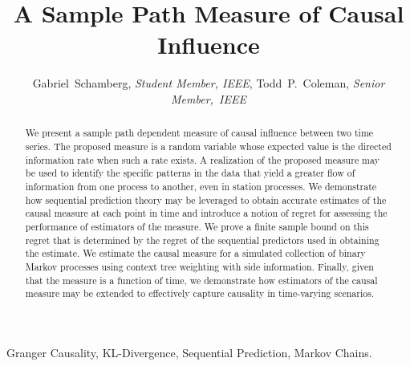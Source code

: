 \documentclass[conference]{IEEEtran}
\begin{document}
\title{A Sample Path Measure of Causal Influence}
%

\author{
Gabriel~Schamberg, \emph{Student Member, IEEE},
Todd~P.~Coleman, \emph{Senior Member,~IEEE}
}

\maketitle


\begin{abstract}
We present a sample path dependent measure of causal influence between two time series. The proposed measure is a random variable whose expected value is the directed information rate when such a rate exists. A realization of the proposed measure may be used to identify the specific patterns in the data that yield a greater flow of information from one process to another, even in station processes. We demonstrate how sequential prediction theory may be leveraged to obtain accurate estimates of the causal measure at each point in time and introduce a notion of regret for assessing the performance of estimators of the measure. We prove a finite sample bound on this regret that is determined by the regret of the sequential predictors used in obtaining the estimate. We estimate the causal measure for a simulated collection of binary Markov processes using context tree weighting with side information. Finally, given that the measure is a function of time, we demonstrate how estimators of the causal measure may be extended to effectively capture causality in time-varying scenarios.
\end{abstract}


\begin{IEEEkeywords}
Granger Causality, KL-Divergence, Sequential Prediction, Markov Chains.
\end{IEEEkeywords}

\IEEEpeerreviewmaketitle









\printbibliography
\end{document}
